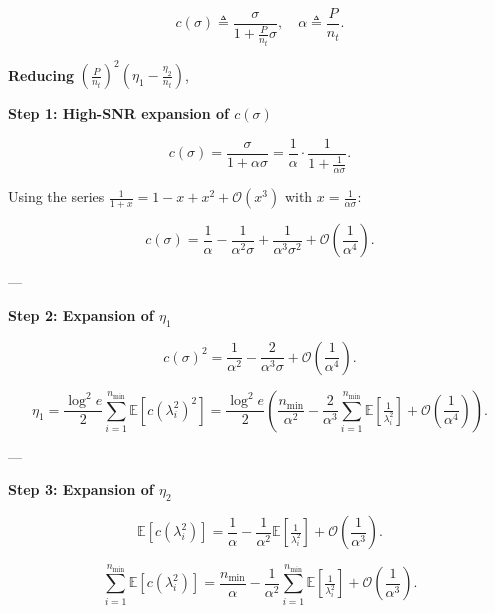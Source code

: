\documentclass[a4paper, 12pt, onecolumn, journal, twoside, draftclsnofoot]{IEEEtran}
\begin{document}
\begin{equation*}
c(\sigma) \triangleq \frac{\sigma}{1+\frac{P}{n_t}\sigma}, 
\quad \alpha \triangleq \frac{P}{n_t}.
\end{equation*}

\textbf{Reducing} $ (\frac{P}{n_t})^2 (\eta_1-\frac{\eta_2}{n_t})$, 

\textbf{Step 1: High-SNR expansion of $c(\sigma)$}

\begin{equation*}
c(\sigma) = \frac{\sigma}{1+\alpha\sigma} 
= \frac{1}{\alpha}\cdot \frac{1}{1+\tfrac{1}{\alpha\sigma}}.
\end{equation*}

Using the series $\tfrac{1}{1+x} = 1 - x + x^2 + \mathcal{O}(x^3)$ with $x=\tfrac{1}{\alpha\sigma}$:

\begin{equation*}
c(\sigma) = \frac{1}{\alpha} - \frac{1}{\alpha^2\sigma} 
+ \frac{1}{\alpha^3\sigma^2} + \mathcal{O}\!\left(\frac{1}{\alpha^4}\right).
\end{equation*}

---

\textbf{Step 2: Expansion of $\eta_1$}

\begin{equation*}
c(\sigma)^2 = \frac{1}{\alpha^2} - \frac{2}{\alpha^3\sigma} 
+ \mathcal{O}\!\left(\frac{1}{\alpha^4}\right).
\end{equation*}

\begin{equation*}
\eta_1 = \frac{\log^2 e}{2}\sum_{i=1}^{n_{\min}}
\mathbb{E}[c(\lambda_i^2)^2]
= \frac{\log^2 e}{2}\left(
\frac{n_{\min}}{\alpha^2} 
- \frac{2}{\alpha^3}\sum_{i=1}^{n_{\min}}\mathbb{E}\!\left[\tfrac{1}{\lambda_i^2}\right]
+ \mathcal{O}\!\left(\frac{1}{\alpha^4}\right)\right).
\end{equation*}

---

\textbf{Step 3: Expansion of $\eta_2$}

\begin{equation*}
\mathbb{E}[c(\lambda_i^2)] = \frac{1}{\alpha} 
- \frac{1}{\alpha^2}\mathbb{E}\!\left[\tfrac{1}{\lambda_i^2}\right]
+ \mathcal{O}\!\left(\frac{1}{\alpha^3}\right).
\end{equation*}

\begin{equation*}
\sum_{i=1}^{n_{\min}}\mathbb{E}[c(\lambda_i^2)]
= \frac{n_{\min}}{\alpha} 
- \frac{1}{\alpha^2}\sum_{i=1}^{n_{\min}}\mathbb{E}\!\left[\tfrac{1}{\lambda_i^2}\right]
+ \mathcal{O}\!\left(\frac{1}{\alpha^3}\right).
\end{equation*}
\end{document}
